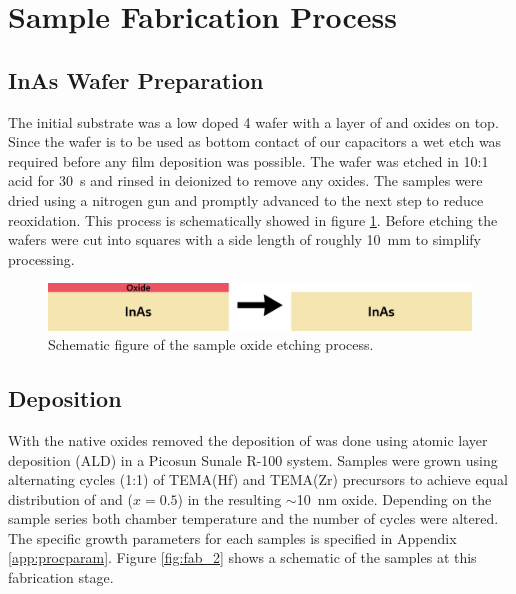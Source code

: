 \documentclass[11pt,twoside]{eitExjobb}
\begin{document}
\section{Sample Fabrication Process}\label{sec:FabProc}


\subsection{InAs Wafer Preparation}
The initial substrate was a low doped  \SI{4}{\inch} wafer with a
layer of  and  oxides on top. Since the wafer is to be used as
bottom contact of our capacitors a wet etch was required before any film
deposition was possible. The wafer was etched in 10:1  acid for
\SI{30}{\second} and rinsed in deionized  to remove any oxides. The
samples were dried using a nitrogen gun and promptly advanced to the next step
to reduce reoxidation. This process is schematically showed in figure
\ref{fig:fab_1}. Before etching the wafers were cut into squares with a side
length of roughly \SI{10}{\milli\meter} to simplify processing.

\begin{figure}[htbp]
    \centering
    \includegraphics[width=.70\linewidth]{fig/fabproc/fab_1.png}
    \caption{Schematic figure of the sample oxide etching process.}\label{fig:fab_1}
\end{figure}

\subsection{ Deposition}
With the native  oxides removed the deposition of 
was done using atomic layer deposition (ALD) in a Picosun Sunale R-100 system.
Samples were grown using alternating cycles (1:1) of TEMA(Hf) and TEMA(Zr)
precursors to achieve equal distribution of  and  ($x=0.5$) in
the resulting $\sim$\SI{10}{\nano\meter} oxide. Depending on the sample series
both chamber temperature and the number of cycles were altered. The specific
growth parameters for each samples is specified in Appendix \ref{app:procparam}.
Figure \ref{fig:fab_2} shows a schematic of the samples at this fabrication
stage.
\end{document}
